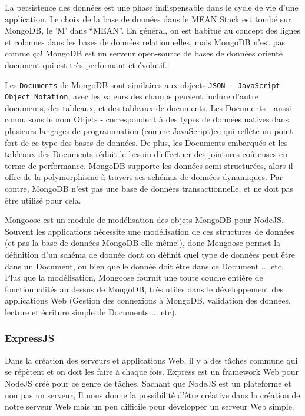 \documentclass[a4paper,11pt,oneside]{report}
\begin{document}
La persistence des données est une phase indispensable dans le cycle de vie d'une application. Le choix de la base de données dans le MEAN Stack est tombé sur MongoDB, le 'M' dans ``MEAN''. En général, on est habitué au concept des lignes et colonnes dans les bases de données relationnelles, mais MongoDB n'est pas comme ça! MongoDB est un serveur open-source de bases de données orienté document\cite{documentDB} qui est très performant et évolutif.
\newline

Les \texttt{Documents} de MongoDB sont similaires aux objects \texttt{JSON - JavaScript Object Notation}\cite{json}, avec les valeurs des champs peuvent inclure d'autre documents, des tableaux, et des tableaux de documents. Les Documents - aussi connu sous le nom Objets - correspondent à des types de données natives dans plusieurs langages de programmation (comme JavaScript)ce qui reflète un point fort de ce type des bases de données. De plus, les Documents embarqués et les tableaux des Documents réduit le besoin d'effectuer des jointures coûteuses en terme de performance. MongoDB supporte les données semi-structurées, alors il offre de la polymorphisme à travers ses schémas de données dynamiques. Par contre, MongoDB n'est pas une base de données transactionnelle, et ne doit pas être utilisé pour cela\cite{mongoDBAndMySQLCompared}.
\newline

Mongoose est un module de modélisation des objets MongoDB pour NodeJS. Souvent les applications nécessite une modélisation de ces structures de données (et pas la base de données MongoDB elle-même!), donc Mongoose permet la définition d'un schéma de donnée dont on définit quel type de données peut être dans un Document, ou bien quelle donnée doit être dans ce Document ... etc. Plus que la modélisation, Mongoose fournit une toute couche entière de fonctionnalités au dessus de MongoDB, très utiles dans le développement des applications Web (Gestion des connexions à MongoDB, validation des données, lecture et écriture simple de Documents ... etc).\cite{mongooseDocs}

\subsubsection{ExpressJS}

Dans la création des serveurs et applications Web, il y a des tâches commune qui se répètent et on doit les faire à chaque fois. Express est un framework Web pour NodeJS créé pour ce genre de tâches. Sachant que NodeJS est un plateforme et non pas un serveur, Il nous donne la possibilité d'être créative dans la création de notre serveur Web mais un peu difficile pour développer un serveur Web simple. 
\newline
\end{document}
